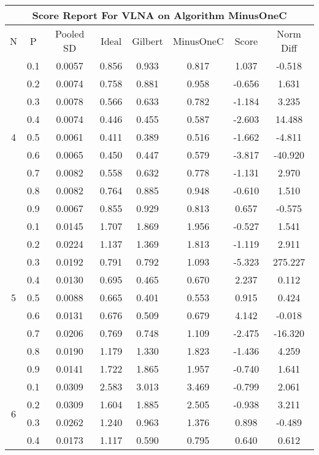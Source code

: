 \documentclass[11pt,a4paper]{report}
\begin{document}
\begin{longtable}{ | c | c || c | c | c | c | c | c | }
\hline
\multicolumn{8}{|c|}{ Score Report For VLNA on Algorithm MinusOneC} \\
\hline
N & P & Pooled SD &  Ideal &  Gilbert & MinusOneC  & Score & Norm Diff \\
 \hline
 \hline
 \endhead
\multirow{9}{*}{4} & 0.1 & 0.0057 & 0.856 & 0.933 & 0.817 & 1.037 & -0.518 \\
 & 0.2 & 0.0074 & 0.758 & 0.881 & 0.958 & -0.656 & 1.631 \\
 & 0.3 & 0.0078 & 0.566 & 0.633 & 0.782 & -1.184 & 3.235 \\
 & 0.4 & 0.0074 & 0.446 & 0.455 & 0.587 & -2.603 & 14.488 \\
 & 0.5 & 0.0061 & 0.411 & 0.389 & 0.516 & -1.662 & -4.811 \\
 & 0.6 & 0.0065 & 0.450 & 0.447 & 0.579 & -3.817 & -40.920 \\
 & 0.7 & 0.0082 & 0.558 & 0.632 & 0.778 & -1.131 & 2.970 \\
 & 0.8 & 0.0082 & 0.764 & 0.885 & 0.948 & -0.610 & 1.510 \\
 & 0.9 & 0.0067 & 0.855 & 0.929 & 0.813 & 0.657 & -0.575 \\
 \hline
\multirow{9}{*}{5} & 0.1 & 0.0145 & 1.707 & 1.869 & 1.956 & -0.527 & 1.541 \\
 & 0.2 & 0.0224 & 1.137 & 1.369 & 1.813 & -1.119 & 2.911 \\
 & 0.3 & 0.0192 & 0.791 & 0.792 & 1.093 & -5.323 & 275.227 \\
 & 0.4 & 0.0130 & 0.695 & 0.465 & 0.670 & 2.237 & 0.112 \\
 & 0.5 & 0.0088 & 0.665 & 0.401 & 0.553 & 0.915 & 0.424 \\
 & 0.6 & 0.0131 & 0.676 & 0.509 & 0.679 & 4.142 & -0.018 \\
 & 0.7 & 0.0206 & 0.769 & 0.748 & 1.109 & -2.475 & -16.320 \\
 & 0.8 & 0.0190 & 1.179 & 1.330 & 1.823 & -1.436 & 4.259 \\
 & 0.9 & 0.0141 & 1.722 & 1.865 & 1.957 & -0.740 & 1.641 \\
 \hline
\multirow{9}{*}{6} & 0.1 & 0.0309 & 2.583 & 3.013 & 3.469 & -0.799 & 2.061 \\
 & 0.2 & 0.0309 & 1.604 & 1.885 & 2.505 & -0.938 & 3.211 \\
 & 0.3 & 0.0262 & 1.240 & 0.963 & 1.376 & 0.898 & -0.489 \\
 & 0.4 & 0.0173 & 1.117 & 0.590 & 0.795 & 0.640 & 0.612 \\

\end{longtable}
\end{document}
